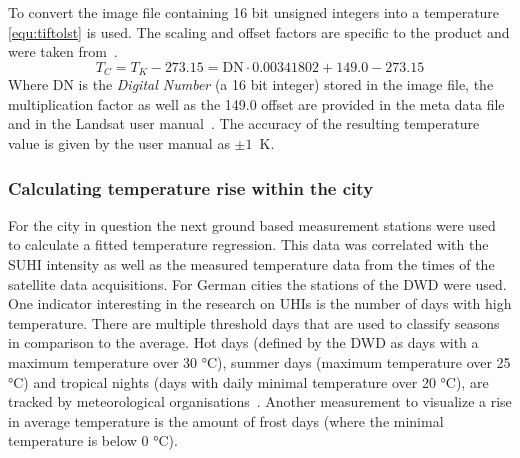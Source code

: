 \documentclass[12pt,a4paper, english,twoside]{scrartcl}
\begin{document}
      To convert the image file containing 16 bit unsigned integers into a temperature \cref{equ:tiftolst} is used. The scaling and offset factors are specific to the product and were taken from~\cite[Table 6-1]{EROASC2013}.
      \begin{equation}\label{equ:tiftolst}
        T_C = T_K - 273.15 = \text{DN} \cdot 0.00341802 + 149.0 - 273.15 
      \end{equation}
      Where DN is the \textit{Digital Number} (a 16 bit integer) stored in the image file, the multiplication factor as well as the 149.0 offset are provided in the meta data file and in the Landsat user manual~\autocite{EROASC2013}. 
      The accuracy of the resulting temperature value is given by the user manual as $\pm 1$~K.
      \newpage
    \subsubsection{Calculating temperature rise within the city}
      For the city in question the next ground based measurement stations were used to calculate a fitted temperature regression. 
      This data was correlated with the \gls{SUHI} intensity as well as the measured temperature data from the times of the satellite data acquisitions. 
      For German cities the stations of the \gls{DWD} were used.
      One indicator interesting in the research on \glspl{UHI} is the number of days with high temperature.
      There are multiple threshold days that are used to classify seasons in comparison to the average.
      Hot days (defined by the \gls{DWD} as days with a maximum temperature over 30 °C), summer days (maximum temperature over 25 °C) and tropical nights (days with daily minimal temperature over 20 °C), are tracked by meteorological organisations~\autocite{dwdklimalexikon}.
      Another measurement to visualize a rise in average temperature is the amount of frost days (where the minimal temperature is below 0 °C). 
\end{document}
